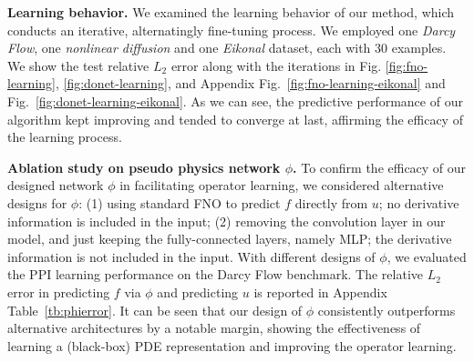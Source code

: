 \noindent \textbf{Learning behavior.} We examined the learning behavior of our method, which conducts an iterative, alternatingly fine-tuning process. We employed one \textit{Darcy Flow}, one \textit{nonlinear diffusion} and one \textit{Eikonal} dataset, each with 30 examples. We show the test relative $L_2$ error along with the iterations in Fig. \ref{fig:fno-learning}, \ref{fig:donet-learning}, and Appendix Fig.~\ref{fig:fno-learning-eikonal} and Fig.~\ref{fig:donet-learning-eikonal}. As we can see, the predictive performance of our algorithm kept improving and tended to converge at last, affirming the efficacy of the learning process. 




\textbf{Ablation study on pseudo physics network $\phi$.} To confirm the efficacy of our designed network $\phi$ in facilitating operator learning, we considered alternative designs for $\phi$: (1) using standard FNO to predict $f$ directly from $u$; no derivative information is included in the input; (2) removing the convolution layer in our model, and just keeping the fully-connected layers, namely MLP; the derivative information is not included in the input. With different designs of $\phi$, we evaluated the PPI learning performance on the Darcy Flow benchmark. The relative $L_2$ error in predicting $f$ via $\phi$ and predicting $u$ is reported in Appendix Table~\ref{tb:phierror}. It can be seen that our design of $\phi$ consistently outperforms alternative architectures by a notable margin, showing the effectiveness of learning a (black-box) PDE representation and improving the operator learning.   


